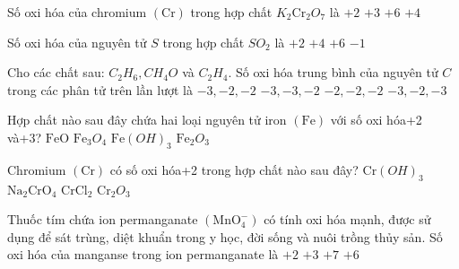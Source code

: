 \begin{ex}[Đề THPT QG-2018]
	Số oxi hóa của chromium $(\mathrm{Cr})$ trong hợp chất $K_2\mathrm{Cr}_2O_7$ là
	\choice
	{$+2$}
	{$+3$}
	{\True $+6$}
	{$+4$}
	\loigiai{}
\end{ex}

\begin{ex}Số oxi hóa của nguyên tử $S$ trong hợp chất $SO_2$ là
	\choice
	{$+2$}
	{\True $+4$}
	{$+6$}
	{$-1$}
	\loigiai{}
\end{ex}

\begin{ex}Cho các chất sau: $C_2H_6, CH_4O$ và $C_2H_4$. Số oxi hóa trung bình của nguyên tử $C$ trong các phân tử trên lần lượt là
	\choice
	{\True $-3,-2,-2$}
	{$-3,-3,-2$}
	{$-2,-2,-2$}
	{$-3,-2,-3$}
	\loigiai{}
\end{ex}

\begin{ex}Hợp chất nào sau đây chứa hai loại nguyên tử iron $(\mathrm{Fe})$ với số oxi hóa+2 và+3?
	\choice
	{$\mathrm{FeO}$}
	{\True $\mathrm{Fe}_3O_4$}
	{$\mathrm{Fe}(OH)_3$}
	{$\mathrm{Fe}_2O_3$}
	\loigiai{}
\end{ex}

\begin{ex}Chromium $(\mathrm{Cr})$ có số oxi hóa+2 trong hợp chất nào sau đây?
	\choice
	{$\mathrm{Cr}(OH)_3$}
	{$\mathrm{Na}_2\mathrm{CrO}_4$}
	{\True $\mathrm{CrCl}_2$}
	{$\mathrm{Cr}_2O_3$}
	\loigiai{}
\end{ex}

\begin{ex}Thuốc tím chứa ion permanganate $\left(\mathrm{MnO}_4^{-}\right)$ có tính oxi hóa mạnh, được sử dụng để sát trùng, diệt khuẩn trong y học, đời sống và nuôi trồng thủy sản. Số oxi hóa của manganse trong ion permanganate là
	\choice
	{$+2$}
	{$+3$}
	{\True $+7$}
	{$+6$}
	\loigiai{}
\end{ex}

